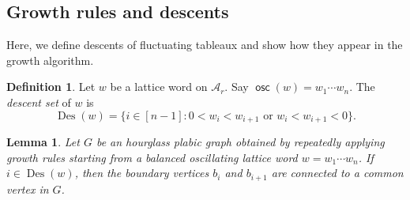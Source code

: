 \documentclass{amsart}
\newtheorem{lemma}[theorem]{Lemma}
\theoremstyle{definition}
\newtheorem{definition}[theorem]{Definition}
\theoremstyle{remark}
\numberwithin{equation}{section}
\DeclareMathOperator{\osc}{\mathsf{osc}}
\DeclareMathOperator{\Des}{Des}
\begin{document}
\subsection{Growth rules and descents}\label{sec:descents}

Here, we define descents of fluctuating tableaux and show how they appear in the growth algorithm.

\begin{definition}\label{def:Des}
  Let $w$ be a lattice word on $\mathcal{A}_r$. Say $\osc(w) = w_1 \cdots w_n$. The \emph{descent set} of $w$ is
    \[ \Des(w) = \{i \in [n-1] : 0 < w_i < w_{i+1} \text{ or } w_i < w_{i+1} < 0\}. \]
\end{definition}

\begin{lemma}\label{lem:descents-are-connected}
  Let $G$ be an hourglass plabic graph obtained by repeatedly applying growth rules starting from a balanced oscillating lattice word $w = w_1 \cdots w_n$. If $i \in \Des(w)$, then the boundary vertices $b_i$ and $b_{i+1}$ are connected to a common vertex in $G$.
\end{lemma}
\end{document}
